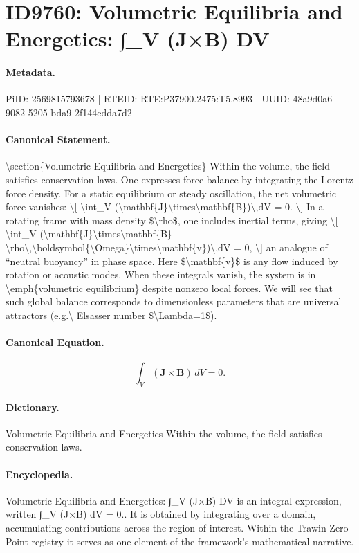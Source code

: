 \section*{ID9760: Volumetric Equilibria and Energetics: ∫\_V (J×B) DV}
\paragraph{Metadata.}
PiID: 2569815793678 | RTEID: RTE:P37900.2475:T5.8993 | UUID: 48a9d0a6-9082-5205-bda9-2f144edda7d2

\paragraph{Canonical Statement.}
\textbackslash{}section\{Volumetric Equilibria and Energetics\} Within the volume, the field satisfies conservation laws. One expresses force balance by integrating the Lorentz force density. For a static equilibrium or steady oscillation, the net volumetric force vanishes: \textbackslash{}[ \textbackslash{}int\_V (\textbackslash{}mathbf\{J\}\textbackslash{}times\textbackslash{}mathbf\{B\})\textbackslash{},dV = 0. \textbackslash{}] In a rotating frame with mass density \$\textbackslash{}rho\$, one includes inertial terms, giving \textbackslash{}[ \textbackslash{}int\_V (\textbackslash{}mathbf\{J\}\textbackslash{}times\textbackslash{}mathbf\{B\} - \textbackslash{}rho\textbackslash{},\textbackslash{}boldsymbol\{\textbackslash{}Omega\}\textbackslash{}times\textbackslash{}mathbf\{v\})\textbackslash{},dV = 0, \textbackslash{}] an analogue of ``neutral buoyancy'' in phase space. Here \$\textbackslash{}mathbf\{v\}\$ is any flow induced by rotation or acoustic modes. When these integrals vanish, the system is in \textbackslash{}emph\{volumetric equilibrium\} despite nonzero local forces. We will see that such global balance corresponds to dimensionless parameters that are universal attractors (e.g.\textbackslash{} Elsasser number \$\textbackslash{}Lambda=1\$).

\paragraph{Canonical Equation.}
\[
\int_V (\mathbf{J}\times\mathbf{B})\,dV = 0.
\]

\paragraph{Dictionary.}
Volumetric Equilibria and Energetics Within the volume, the field satisfies conservation laws.

\paragraph{Encyclopedia.}
Volumetric Equilibria and Energetics: ∫\_V (J×B) DV is an integral expression, written ∫\_V (J×B) dV = 0.. It is obtained by integrating over a domain, accumulating contributions across the region of interest. Within the Trawin Zero Point registry it serves as one element of the framework's mathematical narrative.
